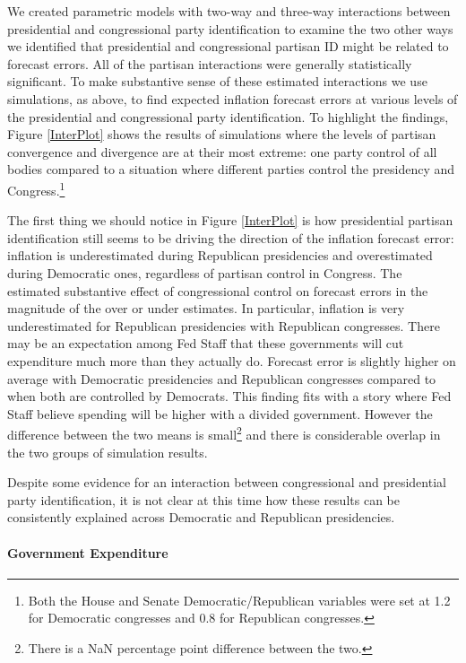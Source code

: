 \documentclass[a4paper]{article}\usepackage{graphicx, color}
\begin{document}
We created parametric models with two-way and three-way interactions between presidential and congressional party identification to examine the two other ways we identified that presidential and congressional partisan ID might be related to forecast errors. All of the partisan interactions were generally statistically significant. To make substantive sense of these estimated interactions we use simulations, as above, to find expected inflation forecast errors at various levels of the presidential and congressional party identification. To highlight the findings, Figure \ref{InterPlot} shows the results of simulations where the levels of partisan convergence and divergence are at their most extreme: one party control of all bodies compared to a situation where different parties control the presidency and Congress.\footnote{Both the House and Senate Democratic/Republican variables were set at 1.2 for Democratic congresses and 0.8 for Republican congresses.} 

The first thing we should notice in Figure \ref{InterPlot} is how presidential partisan identification still seems to be driving the direction of the inflation forecast error: inflation is underestimated during Republican presidencies and overestimated during Democratic ones, regardless of partisan control in Congress. The estimated substantive effect of congressional control on forecast errors in the magnitude of the over or under estimates. In particular, inflation is very underestimated for Republican presidencies with Republican congresses. There may be an expectation among Fed Staff that these governments will cut expenditure much more than they actually do. Forecast error is slightly higher on average with Democratic presidencies and Republican congresses compared to when both are controlled by Democrats. This finding fits with a story where Fed Staff believe spending will be higher with a divided government. However the difference between the two means is small\footnote{There is a NaN percentage point difference between the two.} and there is considerable overlap in the two groups of simulation results.

Despite some evidence for an interaction between congressional and presidential party identification, it is not clear at this time how these results can be consistently explained across Democratic and Republican presidencies. 

\paragraph{Government Expenditure}
\end{document}
